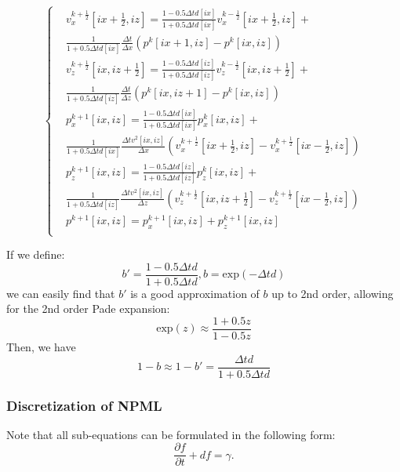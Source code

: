 \begin{equation}
\left\{
\begin{split}
&v_x^{k+\frac{1}{2}}[ix+\frac{1}{2},iz]=\frac{1-0.5\Delta td[ix]}{1+0.5\Delta t d[ix]}v_x^{k-\frac{1}{2}}[ix+\frac{1}{2},iz]+\\
&\frac{1}{1+0.5\Delta t d[ix]}\frac{\Delta t }{\Delta x}(p^k[ix+1,iz]-p^k[ix,iz])\\
&v_z^{k+\frac{1}{2}}[ix,iz+\frac{1}{2}]=\frac{1-0.5\Delta td[iz]}{1+0.5\Delta t d[iz]}v_z^{k-\frac{1}{2}}[ix,iz+\frac{1}{2}]+\\
&\frac{1}{1+0.5\Delta t d[iz]}\frac{\Delta t }{\Delta z}(p^k[ix,iz+1]-p^k[ix,iz])\\
&p_x^{k+1}[ix,iz]=\frac{1-0.5\Delta td[ix]}{1+0.5\Delta t d[ix]}p_x^{k}[ix,iz]+\\
&\frac{1}{1+0.5\Delta t d[ix]}\frac{\Delta t v^2[ix,iz]}{\Delta x}(v_x^{k+\frac{1}{2}}[ix+\frac{1}{2},iz]-v_x^{k+\frac{1}{2}}[ix-\frac{1}{2},iz])\\
&p_z^{k+1}[ix,iz]=\frac{1-0.5\Delta td[iz]}{1+0.5\Delta t d[iz]}p_z^{k}[ix,iz]+\\
&\frac{1}{1+0.5\Delta t d[iz]}\frac{\Delta t v^2[ix,iz]}{\Delta z}(v_z^{k+\frac{1}{2}}[ix,iz+\frac{1}{2}]-v_z^{k+\frac{1}{2}}[ix-\frac{1}{2},iz])\\
&p^{k+1}[ix,iz]=p_x^{k+1}[ix,iz]+p_z^{k+1}[ix,iz]\\
\end{split}
\right.
\end{equation}

If we define: 
\begin{equation}
 b'=\frac{1-0.5\Delta t d}{1+0.5\Delta t d}, b=\mathrm{exp}(-\Delta t d)
\end{equation}
we can easily find that $b'$ is a good approximation of $b$ up to 2nd order, allowing for the 2nd order Pade expansion:
\begin{equation}
 \mathrm{exp}(z)\approx \frac{1+0.5z}{1-0.5z}
\end{equation}
Then, we have
\begin{equation}
1-b\approx 1-b'=\frac{\Delta t d}{1+0.5\Delta t d}
\end{equation}





\subsubsection{Discretization of NPML}

Note that all sub-equations can be formulated in the following form:
\begin{equation}
\frac{\partial f}{\partial t}+d f=\gamma.
\end{equation}

